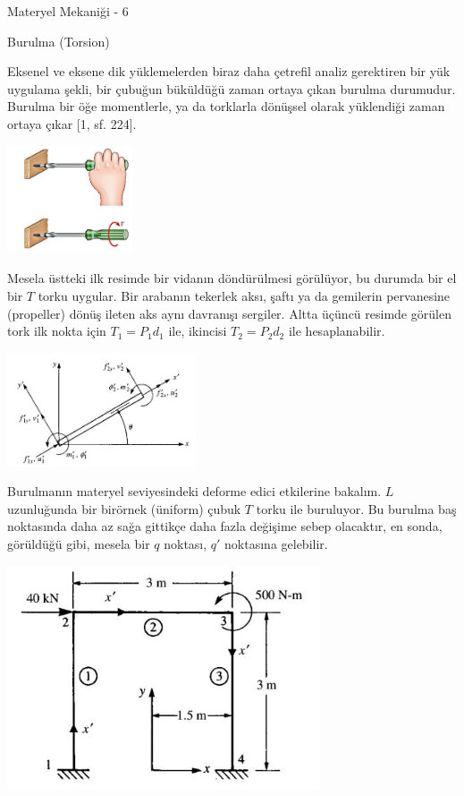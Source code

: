 \documentclass[12pt,fleqn]{article}\usepackage{../../common}
\begin{document}
Materyel Mekaniği - 6

Burulma (Torsion)

Eksenel ve eksene dik yüklemelerden biraz daha çetrefil analiz gerektiren bir
yük uygulama şekli, bir çubuğun büküldüğü zaman ortaya çıkan burulma durumudur.
Burulma bir öğe momentlerle, ya da torklarla dönüşsel olarak yüklendiği zaman
ortaya çıkar [1, sf. 224].

\includegraphics[width=10em]{phy_020_strs_06_01.jpg}

Mesela üstteki ilk resimde bir vidanın döndürülmesi görülüyor, bu durumda bir el
bir $T$ torku uygular. Bir arabanın tekerlek aksı, şaftı ya da gemilerin
pervanesine (propeller) dönüş ileten aks aynı davranışı sergiler.  Altta üçüncü
resimde görülen tork ilk nokta için $T_1 = P_1 d_1$ ile, ikincisi $T_2 = P_2
d_2$ ile hesaplanabilir.

\includegraphics[width=15em]{phy_020_strs_06_02.jpg}

Burulmanın materyel seviyesindeki deforme edici etkilerine bakalım. $L$
uzunluğunda bir birörnek (üniform) çubuk $T$ torku ile buruluyor. Bu
burulma baş noktasında daha az sağa gittikçe daha fazla değişime
sebep olacaktır, en sonda, görüldüğü gibi, mesela bir $q$ noktası, $q'$
noktasına gelebilir. 

\includegraphics[width=25em]{phy_020_strs_06_03.jpg}
\end{document}
